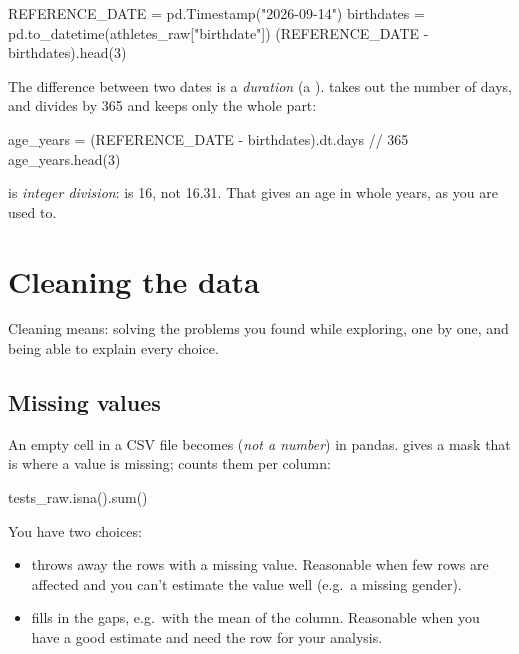 \documentclass[11pt,a4paper]{article}
\begin{document}
\begin{python}
REFERENCE_DATE = pd.Timestamp("2026-09-14")
birthdates = pd.to_datetime(athletes_raw["birthdate"])
(REFERENCE_DATE - birthdates).head(3)
\end{python}

The difference between two dates is a \emph{duration} (a
).  takes out the number of days, and
 divides by 365 and keeps only the whole part:

\begin{python}
age_years = (REFERENCE_DATE - birthdates).dt.days // 365
age_years.head(3)
\end{python}

\code{//} is \emph{integer division}:  is 16, not
16.31. That gives an age in whole years, as you are used to.

\section{Cleaning the data}\label{sec:cleaning}

Cleaning means: solving the problems you found while exploring, one by
one, and being able to explain every choice.

\subsection{Missing values}

An empty cell in a CSV file becomes  (\emph{not a number}) in
pandas.  gives a mask that is  where a value is
missing;  counts them per column:

\begin{python}
tests_raw.isna().sum()
\end{python}

You have two choices:

\begin{itemize}
  \item {} throws away the rows with a missing value.
        Reasonable when few rows are affected and you can't estimate the
        value well (e.g.\ a missing gender).
  \item {} fills in the gaps, e.g.\ with the mean of
        the column. Reasonable when you have a good estimate and need the
        row for your analysis.
\end{itemize}
\end{document}
